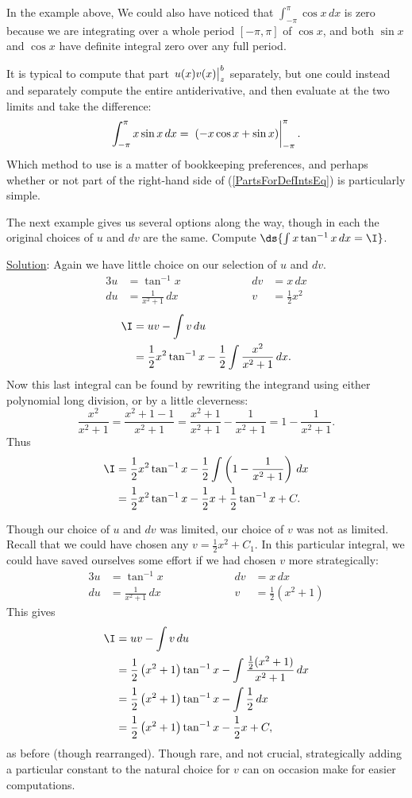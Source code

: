 In the example above,
We could also have  noticed that $\int_{-\pi}^{\pi}\cos x\,dx$
is zero because we are integrating over a whole period 
$[-\pi,\pi]$ of $\cos x$, and both $\sin x$ and $\cos x$
have definite integral zero over any full period.

It is typical to compute that part $\left.\vphantom{\frac22}
  u(x)v(x)\right|_{z}^b$ separately, but one could instead and
separately compute the entire antiderivative, and then 
evaluate at the two limits and take the difference:
$$\int_{-\pi}^{\pi} x\sin x\,dx
=\left.\vphantom{\frac11}\left(-x\cos x+\sin x\right)\right|_{-\pi}^{\pi}.$$
Which method to use is a matter of bookkeeping preferences,
and perhaps whether or not part of the 
right-hand side of (\ref{PartsForDefIntsEq}) is particularly simple.


The next example gives us several options along the way, though
in each the original choices of $u$ and $dv$ are the same.
\bex Compute $\ds{\int x\tan^{-1}x\,dx=\I}$.

\underline{Solution}: Again we have little choice on our selection of
$u$ and $dv$.
\begin{alignat*}{3}
u&=\tan^{-1}x&&\qquad\qquad&dv&=x\,dx\\
du&=\frac1{x^2+1}\,dx&&&v&=\frac12x^2
\end{alignat*}
\begin{align*}
\I&=uv-\int v\,du\\
  &=\frac12x^2\tan^{-1}x-\frac12\int\frac{x^2}{x^2+1}\,dx.\end{align*}
Now this last integral can be found by rewriting
the integrand using either polynomial long division, or 
by a little cleverness:
$$\frac{x^2}{x^2+1}=\frac{x^2+1-1}{x^2+1}=\frac{x^2+1}{x^2+1}
                       -\frac1{x^2+1}=1-\frac1{x^2+1}.$$
Thus
\begin{align*}
\I&=\frac12x^2\tan^{-1}x-\frac12\int\left(1-\frac1{x^2+1}\right)\,dx\\
 &=\frac12x^2\tan^{-1}x-\frac12x+\frac12\tan^{-1}x+C.\end{align*}

Though our choice of $u$ and $dv$ was limited, 
our choice of $v$ was not as limited.  Recall that we could have
chosen any $v=\frac12x^2+C_1$.  In this particular integral, 
we could have saved ourselves some effort if we had chosen
$v$ more strategically:
\begin{alignat*}{3}
u&=\tan^{-1}x&&\qquad\qquad&dv&=x\,dx\\
du&=\frac1{x^2+1}\,dx&&&v&=\frac12\left(x^2+1\right)\end{alignat*}
This gives
\begin{align*}
\I&=uv-\int v\,du\\
  &=\frac12\left(x^2+1\right)\tan^{-1}x-\int\frac{\frac12(x^2+1)}{x^2+1}\,dx\\
  &=\frac12\left(x^2+1\right)\tan^{-1}x-\int\frac12\,dx\\
  &=\frac12\left(x^2+1\right)\tan^{-1}x-\frac12x+C,
\end{align*}
as before (though rearranged).
\eex
Though rare, and not crucial, strategically adding a particular constant
to the natural choice for $v$ can on occasion make for easier computations.




